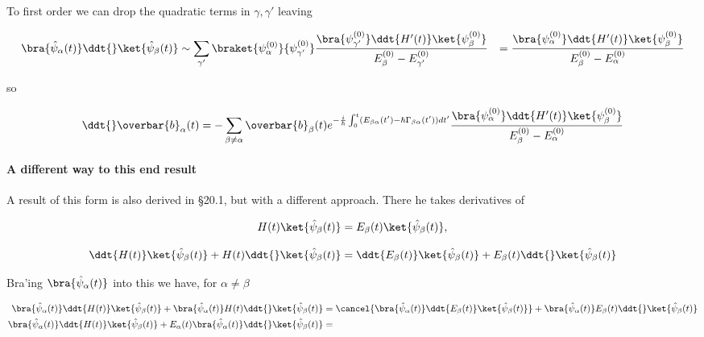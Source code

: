 {To first order we can drop the quadratic terms in $\gamma,\gamma'$ leaving

\begin{equation}\label{eqn:qmTwoR3:530}
\begin{aligned}
\bra{\hat{\psi}_\alpha(t)}
\ddt{} \ket{\hat{\psi}_\beta(t)}
&\sim
\sum_{\gamma'} 
\braket{\psi_{\alpha}^{(0)}}{\psi_{\gamma'}^{(0)}} 
\frac{ 
\bra{\psi_{\gamma'}^{(0)}} \ddt{H'(t)} \ket{\psi_\beta^{(0)}} 
}{
E_\beta^{(0)} 
-E_{\gamma'}^{(0)} 
}
&=
\frac{ 
\bra{\psi_{\alpha}^{(0)}} \ddt{H'(t)} \ket{\psi_\beta^{(0)}} 
}{
E_\beta^{(0)} 
-E_{\alpha}^{(0)} 
}
\end{aligned}
\end{equation}

so

\begin{equation}\label{eqn:qmTwoR3:550}
\ddt{}\overbar{b}_\alpha(t)
=
-\sum_{\beta \ne \alpha} \overbar{b}_\beta(t)
e^{-\frac{i}{\hbar} \int_0^t (E_{\beta\alpha}(t') - \hbar \Gamma_{\beta\alpha}(t')) dt'}
\frac{ 
\bra{\psi_{\alpha}^{(0)}} \ddt{H'(t)} \ket{\psi_\beta^{(0)}} 
}{
E_\beta^{(0)} 
-E_{\alpha}^{(0)} 
}
\end{equation}

\paragraph{A different way to this end result}

A result of this form is also derived in \cite{bohm1989qt} \S 20.1, but with a different approach.  There he takes derivatives of

\begin{equation}\label{eqn:qmTwoR3:610}
H(t) \ket{\hat{\psi}_\beta(t)} = E_\beta(t) \ket{\hat{\psi}_\beta(t)},
\end{equation}

\begin{equation}\label{eqn:qmTwoR3:630}
\ddt{H(t)} \ket{\hat{\psi}_\beta(t)} + H(t) \ddt{}\ket{\hat{\psi}_\beta(t)} = \ddt{E_\beta(t)} \ket{\hat{\psi}_\beta(t)}
+ E_\beta(t) \ddt{} \ket{\hat{\psi}_\beta(t)}
\end{equation}

Bra'ing $\bra{\hat{\psi}_\alpha(t)}$ into this we have, for $\alpha \ne \beta$

\begin{align*}
\bra{\hat{\psi}_\alpha(t)}
\ddt{H(t)} \ket{\hat{\psi}_\beta(t)} 
+ 
\bra{\hat{\psi}_\alpha(t)}
H(t) \ddt{}\ket{\hat{\psi}_\beta(t)} 
&= 
\cancel{
\bra{\hat{\psi}_\alpha(t)}
\ddt{E_\beta(t)} \ket{\hat{\psi}_\beta(t)}
}
+ 
\bra{\hat{\psi}_\alpha(t)}
E_\beta(t) \ddt{} \ket{\hat{\psi}_\beta(t)}
 \\
\bra{\hat{\psi}_\alpha(t)}
\ddt{H(t)} \ket{\hat{\psi}_\beta(t)} 
+ 
E_\alpha(t) \bra{\hat{\psi}_\alpha(t)}
\ddt{}\ket{\hat{\psi}_\beta(t)} 
&=
\end{align*}

}

